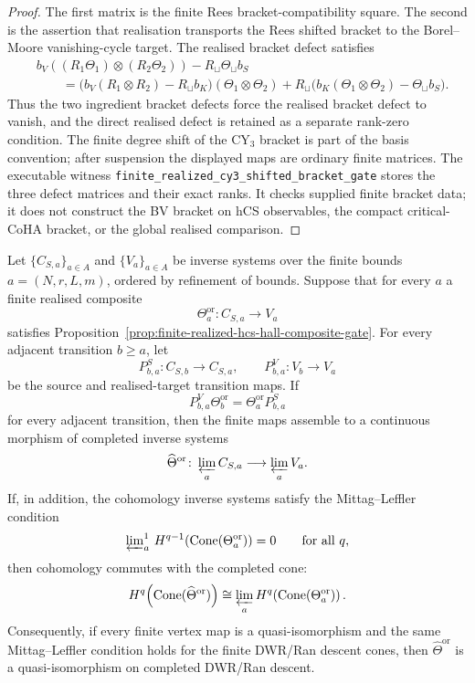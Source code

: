 \begin{proof}
The first matrix is the finite Rees bracket-compatibility square. The
second is the assertion that realisation transports the Rees shifted
bracket to the Borel--Moore vanishing-cycle target. The realised bracket
defect satisfies
\[
\begin{aligned}
&b_V((R_1\Theta_1)\otimes(R_2\Theta_2))
 -R_\sqcup\Theta_\sqcup b_S\\
&\qquad =
\bigl(b_V(R_1\otimes R_2)-R_\sqcup b_K\bigr)
(\Theta_1\otimes\Theta_2)
 +R_\sqcup\bigl(b_K(\Theta_1\otimes\Theta_2)-\Theta_\sqcup b_S\bigr).
\end{aligned}
\]
Thus the two ingredient bracket defects force the realised bracket
defect to vanish, and the direct realised defect is retained as a
separate rank-zero condition. The finite degree shift of the CY$_3$
bracket is part of the basis convention; after suspension the displayed
maps are ordinary finite matrices. The executable witness
\texttt{finite\_realized\_cy3\_shifted\_bracket\_gate} stores the three
defect matrices and their exact ranks. It checks supplied finite
bracket data; it does not construct the BV bracket on hCS observables,
the compact critical-CoHA bracket, or the global realised comparison.
\end{proof}

\begin{proposition}
\label{prop:completed-realized-hcs-hall-transition-ml-gate}
Let \(\{C_{S,a}\}_{a\in A}\) and \(\{V_a\}_{a\in A}\) be inverse
systems over the finite bounds \(a=(N,r,L,m)\), ordered by refinement
of bounds. Suppose that for every \(a\) a finite realised composite
\[
 \Theta^{\mathrm{or}}_a\colon C_{S,a}\longrightarrow V_a
\]
satisfies Proposition~\ref{prop:finite-realized-hcs-hall-composite-gate}.
For every adjacent transition \(b\ge a\), let
\[
 P^S_{b,a}\colon C_{S,b}\to C_{S,a},\qquad
 P^V_{b,a}\colon V_b\to V_a
\]
be the source and realised-target transition maps. If
\[
 P^V_{b,a}\Theta^{\mathrm{or}}_b
 =
 \Theta^{\mathrm{or}}_aP^S_{b,a}
\]
for every adjacent transition, then the finite maps assemble to a
continuous morphism of completed inverse systems
\[
 \widehat\Theta^{\mathrm{or}}\colon
 \varprojlim_a C_{S,a}\longrightarrow\varprojlim_a V_a .
\]
If, in addition, the cohomology inverse systems satisfy the
Mittag--Leffler condition
\[
 \varprojlim\nolimits^{1}_{a}\,
 H^{q-1}\!\left(\operatorname{Cone}(\Theta^{\mathrm{or}}_a)\right)=0
 \qquad\text{for all }q,
\]
then cohomology commutes with the completed cone:
\[
 H^q\!\left(\operatorname{Cone}(\widehat\Theta^{\mathrm{or}})\right)
 \cong
 \varprojlim_a
 H^q\!\left(\operatorname{Cone}(\Theta^{\mathrm{or}}_a)\right).
\]
Consequently, if every finite vertex map is a quasi-isomorphism and the
same Mittag--Leffler condition holds for the finite DWR/Ran descent
cones, then \(\widehat\Theta^{\mathrm{or}}\) is a quasi-isomorphism on
completed DWR/Ran descent.
\end{proposition}

